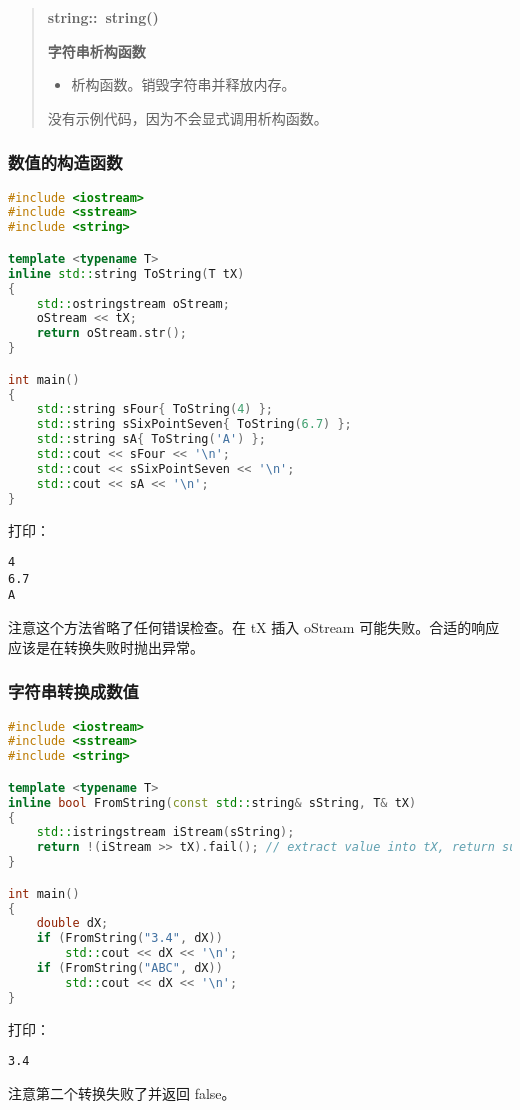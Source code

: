 \documentclass[../../LearnCpp.tex]{subfiles}
\begin{document}
\begin{quotation}
  \textbf{string::~string()}

  \textbf{字符串析构函数}

  \begin{itemize}
    \item 析构函数。销毁字符串并释放内存。
  \end{itemize}

  没有示例代码，因为不会显式调用析构函数。
\end{quotation}

\subsubsection*{数值的构造函数}

\begin{lstlisting}[language=C++]
#include <iostream>
#include <sstream>
#include <string>

template <typename T>
inline std::string ToString(T tX)
{
    std::ostringstream oStream;
    oStream << tX;
    return oStream.str();
}

int main()
{
    std::string sFour{ ToString(4) };
    std::string sSixPointSeven{ ToString(6.7) };
    std::string sA{ ToString('A') };
    std::cout << sFour << '\n';
    std::cout << sSixPointSeven << '\n';
    std::cout << sA << '\n';
}
\end{lstlisting}

打印：

\begin{lstlisting}
4
6.7
A
\end{lstlisting}

注意这个方法省略了任何错误检查。在 tX 插入 oStream 可能失败。合适的响应应该是在转换失败时抛出异常。

\subsubsection*{字符串转换成数值}

\begin{lstlisting}[language=C++]
#include <iostream>
#include <sstream>
#include <string>

template <typename T>
inline bool FromString(const std::string& sString, T& tX)
{
    std::istringstream iStream(sString);
    return !(iStream >> tX).fail(); // extract value into tX, return success or not
}

int main()
{
    double dX;
    if (FromString("3.4", dX))
        std::cout << dX << '\n';
    if (FromString("ABC", dX))
        std::cout << dX << '\n';
}
\end{lstlisting}

打印：

\begin{lstlisting}
3.4
\end{lstlisting}

注意第二个转换失败了并返回 false。
\end{document}
